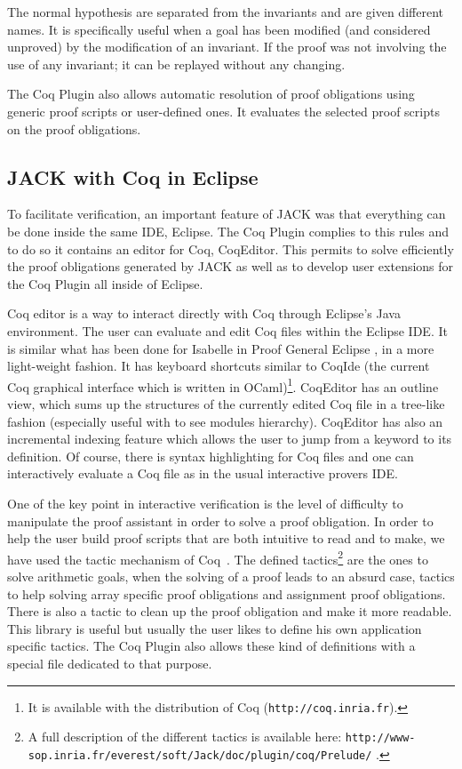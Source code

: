 The normal hypothesis are separated from the invariants and
are given different names.
It is specifically useful when a goal has been modified (and considered 
unproved) by the modification of an invariant. If the proof was not involving
the use of any invariant; it can be replayed without any changing.

The Coq Plugin also allows automatic resolution of proof obligations
using generic proof scripts or user-defined ones.
It evaluates the selected proof scripts on the proof obligations.






\subsection{JACK with Coq in Eclipse}
To facilitate verification, 
an important feature of JACK was that everything can be done inside the same IDE, Eclipse.
The Coq Plugin complies to this rules and to do so it contains an editor for Coq, 
CoqEditor. This permits to solve efficiently the proof obligations generated by JACK as
well as to develop user extensions for the Coq Plugin all inside of Eclipse.

Coq editor is a way to interact directly with Coq through Eclipse's Java 
environment. The user can evaluate and edit Coq files within the
Eclipse IDE. It is similar what has been done for Isabelle in 
Proof General Eclipse \cite{WintersteinAL05}, in a more light-weight fashion.
It has keyboard shortcuts similar to CoqIde (the current Coq graphical
interface which is written in OCaml)\footnote{It is available with the
distribution of Coq (\texttt{http://coq.inria.fr}).}. 
CoqEditor has an outline view,
which sums up the structures of the currently edited Coq file 
in a tree-like fashion (especially useful with to see modules hierarchy). 
CoqEditor has also an incremental indexing feature which allows the user
to jump from a keyword to its definition.
Of course, there is syntax highlighting for Coq files 
and one can interactively evaluate a Coq file
as in the usual interactive provers IDE.


One of the key point in interactive verification is the level of difficulty
to manipulate the proof assistant in order to solve a proof obligation.
In order to help the user build proof scripts that are both intuitive
to read and to make, we have used the tactic mechanism of Coq~\cite{DEL-00-LTAC}.
The defined tactics\footnote{A full description of the different tactics is 
available here:
\texttt{http://www-sop.inria.fr/everest/soft/Jack/doc/plugin/coq/Prelude/} .}
are the ones to solve arithmetic goals,
when the solving of a proof leads to an absurd case, tactics to help solving
array specific proof obligations and assignment proof obligations. There is also
a tactic to clean up the proof obligation and make it more readable.
This library is useful but usually the user likes to define his own application
specific tactics. The Coq Plugin also allows these kind of definitions with a
special file dedicated to that purpose.




